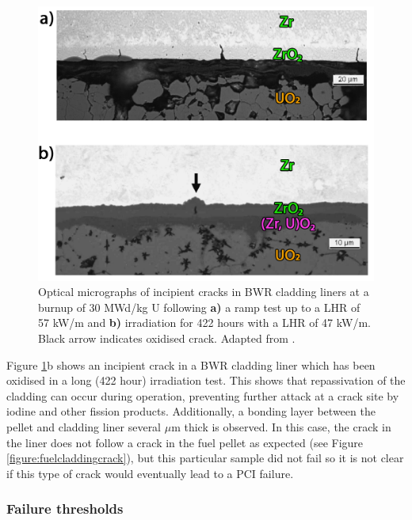 \begin{figure}[ht] %
\centering
\includegraphics[width=14cm]{images/linercracks.png}
\caption[Optical micrographs of incipient cracks in BWR cladding liners at a burnup of 30 MWd/kg U following \textbf{a)} a ramp test up to a LHR of 57 kW/m and \textbf{b)} irradiation for 422 hours with a LHR of 47 kW/m. Black arrow indicates oxidised crack.]{Optical micrographs of incipient cracks in BWR cladding liners at a burnup of 30 MWd/kg U following \textbf{a)} a ramp test up to a LHR of 57 kW/m and \textbf{b)} irradiation for 422 hours with a LHR of 47 kW/m. Black arrow indicates oxidised crack. Adapted from \cite{Kitano2006}.}
\label{figure:linercracks}
\end{figure}

Figure \ref{figure:linercracks}b shows an incipient crack in a BWR cladding liner which has been oxidised in a long (422 hour) irradiation test. This shows that repassivation of the cladding can occur during operation, preventing further attack at a crack site by iodine and other fission products. Additionally, a bonding layer between the pellet and cladding liner several $\mu$m thick is observed. In this case, the crack in the liner does not follow a crack in the fuel pellet as expected (see Figure \ref{figure:fuelcladdingcrack}), but this particular sample did not fail so it is not clear if this type of crack would eventually lead to a PCI failure. 

\subsubsection{Failure thresholds}

